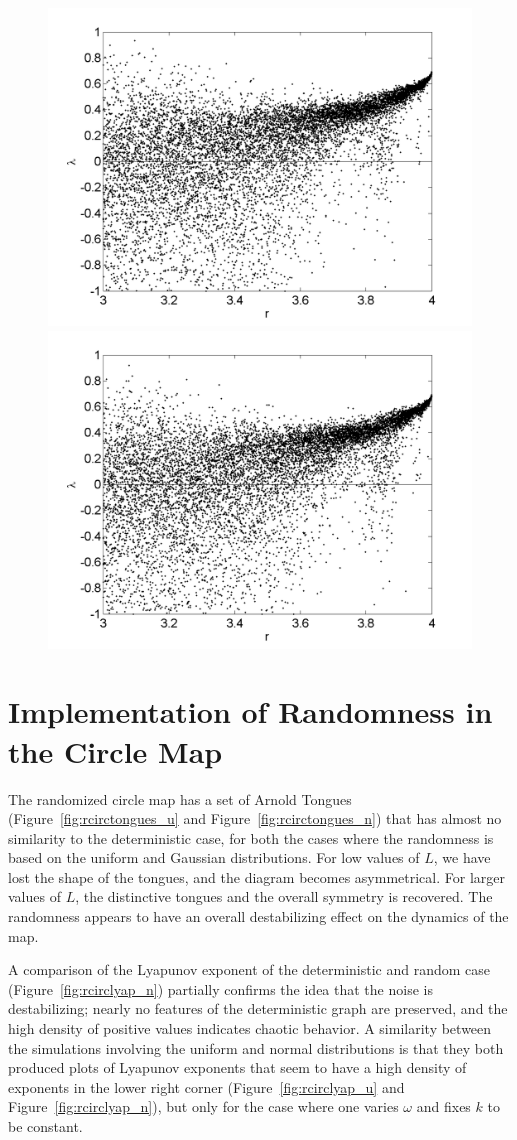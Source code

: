 \begin{figure}[!h]
\includegraphics[width=.5\textwidth]{figs/rlog_lyap_L_07.png}\hfill
\includegraphics[width=.5\textwidth]{figs/rlog_lyap_L_09.png}\\
\end{figure}

\section{Implementation of Randomness in the Circle Map}
The randomized circle map has a set of Arnold Tongues (Figure~\ref{fig:rcirctongues_u} and
Figure~\ref{fig:rcirctongues_n}) that has almost no similarity to the deterministic
case, for both the cases where the randomness is based on the uniform
and Gaussian distributions. For low values of $L$, we have lost the
shape of the tongues, and the diagram becomes asymmetrical. For larger
values of $L$, the distinctive tongues and the overall symmetry is
recovered. The randomness appears to have an overall destabilizing
effect on the dynamics of the map.

A comparison of the Lyapunov exponent of the deterministic and random
case (Figure~\ref{fig:rcirclyap_n}) partially confirms the idea that
the noise is destabilizing; nearly no features of the deterministic
graph are preserved, and the high density of positive values indicates
chaotic behavior. A similarity between the simulations involving the uniform and normal
distributions is that they both produced plots of Lyapunov exponents that seem to have a
high density of exponents in the lower right corner
(Figure~\ref{fig:rcirclyap_u} and Figure~\ref{fig:rcirclyap_n}), but
only for the case where one varies $\omega$ and fixes $k$ to be constant.

